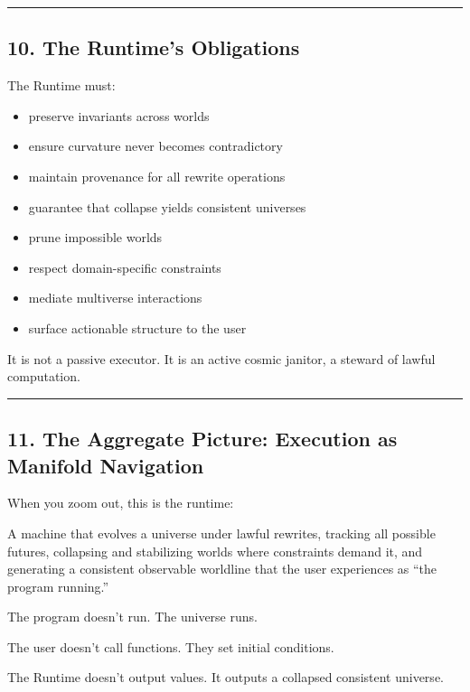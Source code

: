 \begin{center}\rule{0.5\linewidth}{0.5pt}\end{center}

\subsection{10. The Runtime's
Obligations}\label{the-runtimes-obligations}

The Runtime must:

\begin{itemize}
\tightlist
\item
  preserve invariants across worlds
\item
  ensure curvature never becomes contradictory
\item
  maintain provenance for all rewrite operations
\item
  guarantee that collapse yields consistent universes
\item
  prune impossible worlds
\item
  respect domain-specific constraints
\item
  mediate multiverse interactions
\item
  surface actionable structure to the user
\end{itemize}

It is not a passive executor. It is an active cosmic janitor, a steward
of lawful computation.

\begin{center}\rule{0.5\linewidth}{0.5pt}\end{center}

\subsection{11. The Aggregate Picture: Execution as Manifold
Navigation}\label{the-aggregate-picture-execution-as-manifold-navigation}

When you zoom out, this is the runtime:

A machine that evolves a universe under lawful rewrites, tracking all
possible futures, collapsing and stabilizing worlds where constraints
demand it, and generating a consistent observable worldline that the
user experiences as ``the program running.''

The program doesn't run. The universe runs.

The user doesn't call functions. They set initial conditions.

The Runtime doesn't output values. It outputs a collapsed consistent
universe.
